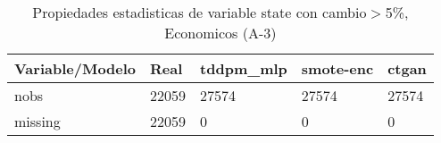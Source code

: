 \begin{table}[H]
\centering
\fontsize{8}{14}\selectfont
\caption{Propiedades estadisticas de variable state con cambio\ensuremath{>}5\%, Economicos (A-3)}
\label{table-stats-economicos-a-3-state-short}
\begin{tabular}{|l|m{10em}|m{10em}|m{10em}|m{10em}|}
\hline
 \rowcolor[gray]{0.8}
Variable/Modelo & Real & tddpm\_mlp & smote-enc & ctgan \\
\hline nobs & 22059 & 27574 & 27574 & 27574 \\
\hline missing & 22059 & 0 & 0 & 0 \\
\hline
\end{tabular}
\end{table}
